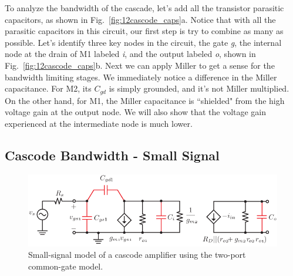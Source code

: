 To analyze the bandwidth of the cascade, let's add all the transistor parasitic capacitors, as shown in Fig.~\ref{fig:12cascode_caps}a.  Notice that with all the parasitic capacitors in this circuit, our first step is try to combine as many as possible.   Let's identify three key nodes in the circuit, the gate \emph{g}, the internal node at the drain of M1 labeled \emph{i}, and the output labeled \emph{o}, shown in Fig.~\ref{fig:12cascode_caps}b.  Next we can apply Miller to get a sense for the bandwidth limiting stages.  We immediately notice a difference in the Miller capacitance.  For M2, its $C_{gd}$ is simply grounded, and it's not Miller multiplied.  On the other hand, for M1, the Miller capacitance is ``shielded" from the high voltage gain at the output node.  We will also show that the voltage gain experienced at the intermediate node is much lower.  
\subsection{Cascode Bandwidth - Small Signal}
\begin{figure}[tb]
\begin{center}
\includegraphics[scale=1]{14cascode_ac_ss}
\end{center}
\caption{Small-signal model of a cascode amplifier using the two-port common-gate model.} \label{fig:14cascode_ac_ss}
\end{figure}

